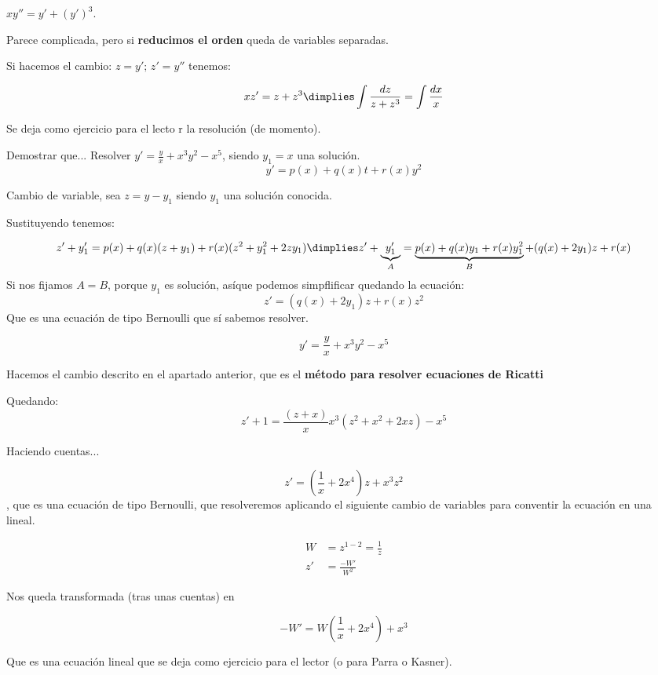 \documentclass[nochap]{apuntes}
\begin{document}
\begin{problem}[20]
\ppart
\solution
\spart $xy'' = y' +(y')^3$.

Parece complicada, pero si \textbf{reducimos el orden}  queda de variables separadas.

Si hacemos el cambio: $z=y';\,z'=y''$ tenemos:

\[xz' = z+z^3 \dimplies \int \frac{dz}{z+z^3} = \int\frac{dx}{x}\]

Se deja como ejercicio para el lecto r la resolución (de momento).
\end{problem}

\begin{problem}[22]
\ppart Demostrar que...
\ppart Resolver $\displaystyle y'=\frac{y}{x} + x^3y^2 -x^5$, siendo $y_1=x$ una solución.
\solution
\spart $$y'=p(x) + q(x)t+r(x)y^2$$

Cambio de variable, sea $z = y - y_1$ siendo $y_1$ una solución conocida. 

Sustituyendo tenemos:

\[z'+ y_1' = p(x)+ q(x)(z+y_1)+r(x)(z^2+y_1^2+2zy_1) \dimplies z'+ \underbrace{y_1'}_{A} = \underbrace{p(x) + q(x)y_1+r(x)y_1^2}_{B} + (q(x) + 2y_1)z+r(x)\]
Si nos fijamos $A=B$, porque $y_1$ es solución, asíque podemos simpflificar  quedando la ecuación:$$z'=(q(x)+2y_1)z+r(x)z^2$$ Que es una ecuación de tipo Bernoulli que sí sabemos resolver.

\spart
$$y'=\frac{y}{x} + x^3y^2 -x^5$$

Hacemos el cambio descrito en el apartado anterior, que es el \textbf{método para resolver ecuaciones de Ricatti} 

Quedando: \[z'+1 = \frac{(z+x)}{x}x^3(z^2+x^2+2xz)-x^5\]

Haciendo cuentas...

\[z'=\left(\frac{1}{x}+2x^4\right)z+x^3z^2\], que es una ecuación de tipo Bernoulli, que resolveremos aplicando el siguiente cambio de variables para conventir la ecuación en una lineal.

\[\begin{array}{cc}
W&=z^{1-2} = \frac{1}{z}\\
z'&=\frac{-W'}{W^2}
\end{array}\]

Nos queda transformada (tras unas cuentas) en

$$-W' = W\left(\frac{1}{x}+2x^4\right)+x^3$$

Que es una ecuación lineal que se deja como ejercicio para el lector (o para Parra o Kasner).

\end{problem}
\end{document}
